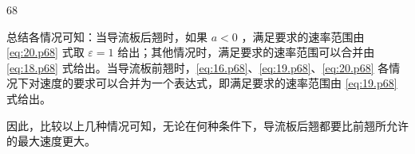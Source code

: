 \begin{solution}{68}
\begin{subsolution}
        总结各情况可知：当导流板后翘时，如果 $a<0$ ，满足要求的速率范围由 \eqref{eq:20.p68} 式取 $\varepsilon=1$ 给出；其他情况时，满足要求的速率范围可以合并由 \eqref{eq:18.p68} 式给出。当导流板前翘时，\eqref{eq:16.p68}、\eqref{eq:19.p68}、\eqref{eq:20.p68} 各情况下对速度的要求可以合并为一个表达式，即满足要求的速率范围由 \eqref{eq:19.p68} 式给出。

        因此，比较以上几种情况可知，无论在何种条件下，导流板后翘都要比前翘所允许的最大速度更大。
    \end{subsolution}
\end{solution}